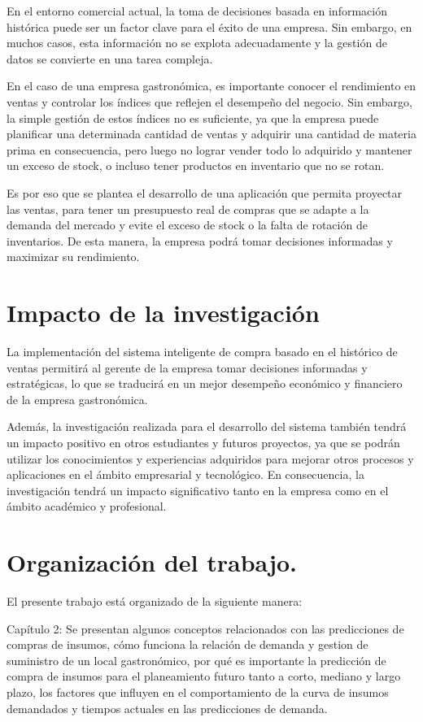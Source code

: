 En el entorno comercial actual, la toma de decisiones basada en información histórica puede ser un factor clave para el éxito de una empresa. Sin embargo, en muchos casos, esta información no se explota adecuadamente y la gestión de datos se convierte en una tarea compleja.

En el caso de una empresa gastronómica, es importante conocer el rendimiento en ventas y controlar los índices que reflejen el desempeño del negocio. Sin embargo, la simple gestión de estos índices no es suficiente, ya que la empresa puede planificar una determinada cantidad de ventas y adquirir una cantidad de materia prima en consecuencia, pero luego no lograr vender todo lo adquirido y mantener un exceso de stock, o incluso tener productos en inventario que no se rotan.

Es por eso que se plantea el desarrollo de una aplicación que permita proyectar las ventas, para tener un presupuesto real de compras que se adapte a la demanda del mercado y evite el exceso de stock o la falta de rotación de inventarios. De esta manera, la empresa podrá tomar decisiones informadas y maximizar su rendimiento.



\section{Impacto de la investigación}

La implementación del sistema inteligente de compra basado en el histórico de ventas permitirá al gerente de la empresa tomar decisiones informadas y estratégicas, lo que se traducirá en un mejor desempeño económico y financiero de la empresa gastronómica.

Además, la investigación realizada para el desarrollo del sistema también tendrá un impacto positivo en otros estudiantes y futuros proyectos, ya que se podrán utilizar los conocimientos y experiencias adquiridos para mejorar otros procesos y aplicaciones en el ámbito empresarial y tecnológico. En consecuencia, la investigación tendrá un impacto significativo tanto en la empresa como en el ámbito académico y profesional.






\section{Organización del trabajo.} 
El presente trabajo está organizado de la siguiente manera:

\vspace{12pt}Capítulo 2: Se presentan algunos conceptos relacionados con las predicciones de compras de insumos, cómo funciona la relación de demanda y gestion de suministro de un local gastronómico, por qué es importante la predicción de compra de insumos para el planeamiento futuro tanto a corto, mediano y largo plazo, los factores que influyen en el comportamiento de la curva de insumos demandados y tiempos actuales en las predicciones de demanda. 

